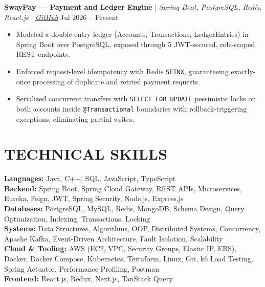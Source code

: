 \documentclass[a4paper,10pt]{article}
\begin{document}
\noindent\textbf{\color{mainblue}SwayPay --- Payment and Ledger Engine} | \textit{Spring Boot, PostgreSQL, Redis, React.js} | \href{https://github.com/cyberpunk47/SwayPay}{\textit{GitHub}} \hfill Jul 2026 -- Present
\begin{itemize}[leftmargin=1.5em, itemsep=0pt, topsep=1pt, parsep=0pt, partopsep=0pt, label={\textbullet}]
    \item Modeled a double-entry ledger (Accounts, Transactions, LedgerEntries) in Spring Boot over PostgreSQL, exposed through 5 JWT-secured, role-scoped REST endpoints.
    \item Enforced request-level idempotency with Redis \texttt{SETNX}, guaranteeing exactly-once processing of duplicate and retried payment requests.
    \item Serialized concurrent transfers with \texttt{SELECT FOR UPDATE} pessimistic locks on both accounts inside \texttt{@Transactional} boundaries with rollback-triggering exceptions, eliminating partial writes.
\end{itemize}

\section*{TECHNICAL SKILLS}
\noindent\textbf{\color{mainblue}Languages:} Java, C++, SQL, JavaScript, TypeScript \\[2pt]
\noindent\textbf{\color{mainblue}Backend:} Spring Boot, Spring Cloud Gateway, REST APIs, Microservices, Eureka, Feign, JWT, Spring Security, Node.js, Express.js \\[2pt]
\noindent\textbf{\color{mainblue}Databases:} PostgreSQL, MySQL, Redis, MongoDB, Schema Design, Query Optimization, Indexing, Transactions, Locking \\[2pt]
\noindent\textbf{\color{mainblue}Systems:} Data Structures, Algorithms, OOP, Distributed Systems, Concurrency, Apache Kafka, Event-Driven Architecture, Fault Isolation, Scalability \\[2pt]
\noindent\textbf{\color{mainblue}Cloud \& Tooling:} AWS (EC2, VPC, Security Groups, Elastic IP, EBS), Docker, Docker Compose, Kubernetes, Terraform, Linux, Git, k6 Load Testing, Spring Actuator, Performance Profiling, Postman \\[2pt]
\noindent\textbf{\color{mainblue}Frontend:} React.js, Redux, Next.js, TanStack Query

\end{document}
